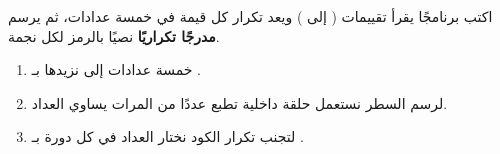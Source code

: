 \begin{statement}
اكتب برنامجًا يقرأ  تقييمات ( إلى ) ويعد تكرار كل قيمة في خمسة عدادات، ثم يرسم \textbf{مدرجًا تكراريًا} نصيًا بالرمز \code{*} لكل نجمة.
\end{statement}
\begin{stepsbox}\begin{enumerate}
\item خمسة عدادات  إلى  نزيدها بـ .
\item لرسم السطر  نستعمل حلقة داخلية تطبع \code{*} عددًا من المرات يساوي العداد.
\item لتجنب تكرار الكود نختار العداد في كل دورة بـ .
\end{enumerate}\end{stepsbox}
